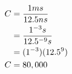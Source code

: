 \documentclass[preview,border=3mm]{standalone}
\begin{document}
\begin{align}
    C &= \frac{1ms}{12.5ns}\cr
      &= \frac{1^{-3}s}{12.5^{-9}s}\cr
      &= (1^{-3})(12.5^{9})\cr
    C &= 80,000
\end{align}
\end{document}
